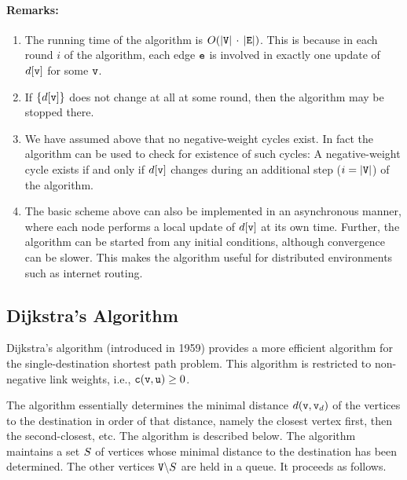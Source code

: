\paragraph{Remarks:}
\begin{enumerate}
  \item The running time of the algorithm is $O(|{\tt V}|\, \cdot \,|{\tt E}|)$. This is because in each round $i$ of the algorithm, each edge ${\tt e}$ is involved in exactly one update of $d[{\tt v}]$ for some ${\tt v}$.
  \item If $\{ d[{\tt v}]\}$ does not change at all at some round, then the algorithm may be stopped there.
  \item We have assumed above that no negative-weight cycles exist. In fact the algorithm can be used to check for existence of such cycles: A negative-weight cycle exists if and only if  $d[{\tt v}]$ changes during an additional step ($i = |{\tt V}|$) of the algorithm.
  \item The basic scheme above can also be implemented in an asynchronous manner, where each node performs a local update of $d[{\tt v}]$ at its own time. Further, the algorithm can be started from any initial conditions, although convergence can be slower. This makes the algorithm useful for distributed environments such as internet routing.
\end{enumerate}

\subsection{Dijkstra's Algorithm}
Dijkstra's algorithm (introduced in 1959) provides a more efficient algorithm for the single-destination shortest path problem. This algorithm is restricted to non-negative link weights, i.e., ${\tt c}({\tt v},{\tt u}) \ge 0$.

The algorithm essentially determines the minimal distance $d({\tt v},{\tt v}_d)$ of the vertices to the destination in order of that distance, namely the closest vertex first, then the second-closest, etc.  The algorithm is 
described below.
The algorithm maintains a set ${S}$ of vertices whose minimal distance to the destination has been determined. The other vertices ${\tt V}\backslash {S}$ are held in a queue. It proceeds as follows.

